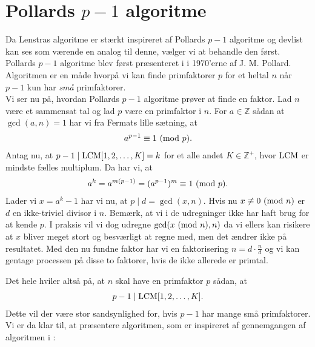 \section{Pollards $p-1$ algoritme}

Da Lenstras algoritme er stærkt inspireret af Pollards $p-1$ algoritme og devlist kan ses som værende en analog til denne, vælger vi at behandle den først. Pollards $p-1$ algoritme blev først præsenteret i \cite{Pollard} i 1970'erne af J. M. Pollard. Algoritmen er en måde hvorpå vi kan finde primfaktorer $p$ for et heltal $n$ når $p-1$ kun har \textit{små} primfaktorer. 
\\[10pt]
Vi ser nu på, hvordan Pollards $p-1$ algoritme prøver at finde en faktor. Lad $n$ være et sammensat tal og lad $p$ være en primfaktor i $n$. For $a \in \mathbb{Z}$ sådan at $\gcd(a, n)=1$ har vi fra Fermats lille sætning, at 
\begin{align*}
	a^{p-1} \equiv 1 \ (\mathrm{mod} \ p).
\end{align*}
Antag nu, at $p-1 \mid \mathrm{LCM}[1, 2, \ldots, K] = k$ for et alle andet $K \in \mathbb{Z}^+$, hvor $\mathrm{LCM}$ er mindste fælles multiplum. Da har vi, at
\begin{align*}
	a^{k} = a^{m(p-1)} = (a^{p-1})^m \equiv 1 \ (\mathrm{mod} \ p).
\end{align*}
Lader vi $x = a^{k} - 1$ har vi nu, at $p \mid d = \gcd(x, n)$. Hvis nu $x \not \equiv 0 \ (\mathrm{mod} \ n)$ er $d$ en ikke-triviel divisor i $n$. Bemærk, at vi i de udregninger ikke har haft brug for at kende $p$. I praksis vil vi dog udregne $\gcd(x \ (\mathrm{mod} \ n), n)$ da vi ellers kan risikere at $x$ bliver meget stort og besværligt at regne med, men det ændrer ikke på resultatet. Med den nu fundne faktor har vi en faktorisering $n=d \cdot \frac{n}{d}$ og vi kan gentage processen på disse to faktorer, hvis de ikke allerede er primtal. 

Det hele hviler altså på, at $n$ skal have en primfaktor $p$ sådan, at 
\begin{align*}
	p-1 \mid \mathrm{LCM}[1, 2, \ldots, K].
\end{align*} 
Dette vil der være stor sandsynlighed for, hvis $p-1$ har mange små primfaktorer. Vi er da klar til, at præsentere algoritmen, som er inspireret af gennemgangen af algoritmen i \cite{Silverman}:

